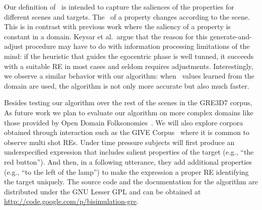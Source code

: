 Our definition of \puse\ is intended to capture the saliences of the properties for different scenes and targets. The \puse\ of a property changes according to the scene. This is in contrast with previous work where the saliency of a property is constant in a domain. Keysar et al.~argue that the reason for this generate-and-adjust procedure may have to do with information processing limitations of the mind: if the heuristic that guides the egocentric phase is well tunned, it succeeds with a suitable RE in most cases and seldom requires adjustments. Interestingly, we observe a similar behavior with our algorithm: when \puse\ values learned from the domain are used, the algorithm is not only more accurate but also much faster. 

Besides testing our algorithm over the rest of the scenes in the GRE3D7 corpus, 
As future work we plan to evaluate our algorithm on more complex domains 
like those provided by Open Domain Folksonomies~\cite{pacheco-duboue-dominguez:2012:NAACL-HLT}. We will also 
explore corpora obtained through interaction
such as the GIVE Corpus~\cite{GarGarKolStr10} where it is common to observe multi shot REs. Under time pressure subjects will first produce an underspecified expression that includes salient properties of the target (e.g., ``the red button'').  And then, in a following utterance, they add additional properties (e.g., ``to the left of the lamp'') to make the expression a proper RE  identifying the target uniquely. The source code and the documentation for the algorithm are distributed under the GNU Lesser GPL and can be obtained at \url{http://code.google.com/p/bisimulation-gre}.
